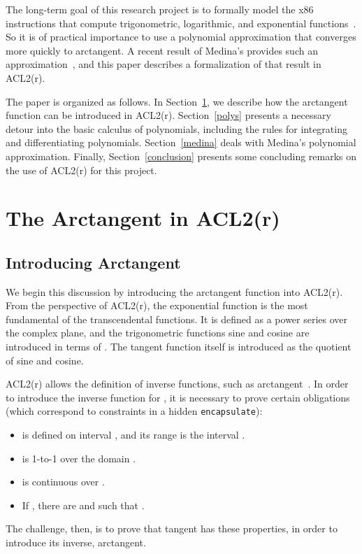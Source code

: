 \documentclass[copyright,creativecommons]{eptcs}
\begin{document}
The long-term goal of this research project is to formally model the
x86 instructions that compute trigonometric, logarithmic, and
exponential functions~\cite{Rus:transcendentals}.  So it is of
practical importance to use a polynomial approximation that converges
more quickly to arctangent. A recent result of Medina's provides such
an approximation~\cite{Med:arctan}, and this paper describes a
formalization of that result in ACL2(r).

The paper is organized as follows.  In Section~\ref{arctan}, we
describe how the arctangent function can be introduced in
ACL2(r). Section~\ref{polys} presents a necessary detour into the
basic calculus of polynomials, including the rules for integrating and
differentiating polynomials. Section~\ref{medina} deals with Medina's
polynomial approximation. Finally, Section~\ref{conclusion} presents
some concluding remarks on the use of ACL2(r) for this project.

\section{The Arctangent in ACL2(r)}
\label{arctan}

\subsection{Introducing Arctangent}

We begin this discussion by introducing the arctangent function into
ACL2(r). From the perspective of ACL2(r), the exponential function
 is the most  fundamental of the transcendental functions. It is
defined as a power series over the complex plane, and the
trigonometric functions sine and cosine are introduced in terms
of . The tangent function itself is introduced as
the quotient of sine and cosine.

ACL2(r) allows the definition of inverse functions, such as
arctangent~\cite{GaCo:inverses}.  In order to introduce the inverse
function for , it is necessary to prove certain obligations
(which correspond to constraints in a hidden \texttt{encapsulate}):
\begin{itemize}
\item  is defined on interval , and its range is
  the interval .
\item  is 1-to-1 over the domain .
\item  is continuous over .
\item If , there are  and  such
  that .
\end{itemize}
The challenge, then, is to prove that tangent has these properties, in
order to introduce its inverse, arctangent.
\end{document}
